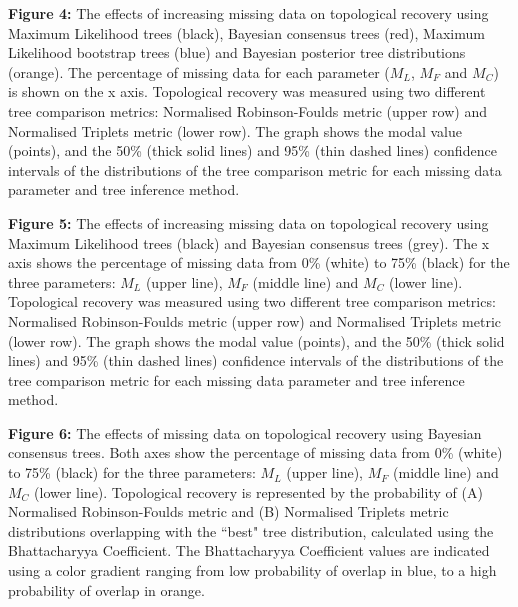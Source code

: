 \documentclass[12pt,letterpaper]{article}
\begin{document}
\bigskip
\noindent
\textbf{Figure 4:} The effects of increasing missing data on topological recovery using Maximum Likelihood trees (black), Bayesian consensus trees (red), Maximum Likelihood bootstrap trees (blue) and Bayesian posterior tree distributions (orange). The percentage of missing data for each parameter ($M_{L}$, $M_{F}$ and $M_{C}$) is shown on the x axis. Topological recovery was measured using two different tree comparison metrics: Normalised Robinson-Foulds metric (upper row) and Normalised Triplets metric (lower row). The graph shows the modal value (points), and the 50\% (thick solid lines) and 95\% (thin dashed lines) confidence intervals of the distributions of the tree comparison metric for each missing data parameter and tree inference method.


\bigskip
\noindent
\textbf{Figure 5:} The effects of increasing missing data on topological recovery using Maximum Likelihood trees (black) and Bayesian consensus trees (grey). The x axis shows the percentage of missing data from 0\% (white) to 75\% (black) for the three parameters: $M_{L}$ (upper line), $M_{F}$ (middle line) and $M_{C}$ (lower line). Topological recovery was measured using two different tree comparison metrics: Normalised Robinson-Foulds metric (upper row) and Normalised Triplets metric (lower row). The graph shows the modal value (points), and the 50\% (thick solid lines) and 95\% (thin dashed lines) confidence intervals of the distributions of the tree comparison metric for each missing data parameter and tree inference method.

\bigskip
\noindent
\textbf{Figure 6:} The effects of missing data on topological recovery using Bayesian consensus trees. Both axes show the percentage of missing data from 0\% (white) to 75\% (black) for the three parameters: $M_{L}$ (upper line), $M_{F}$ (middle line) and $M_{C}$ (lower line). Topological recovery is represented by the probability of (A) Normalised Robinson-Foulds metric and (B) Normalised Triplets metric distributions overlapping with the ``best" tree distribution, calculated using the Bhattacharyya Coefficient. The Bhattacharyya Coefficient values are indicated using a color gradient ranging from low probability of overlap in blue, to a high probability of overlap in orange.
\end{document}
